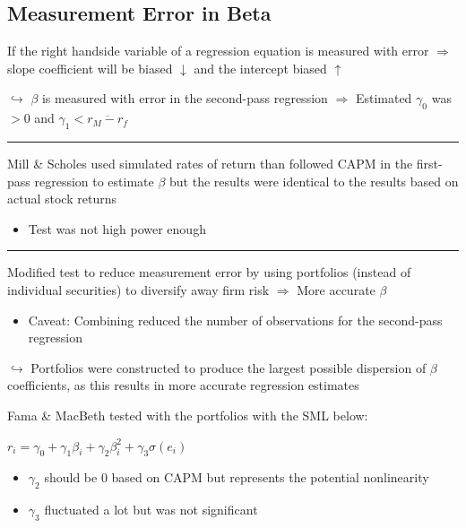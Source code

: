 \documentclass[]{book}
\providecommand{\tightlist}{%
  \setlength{\itemsep}{0pt}\setlength{\parskip}{0pt}}
\theoremstyle{definition}
\theoremstyle{definition}
\theoremstyle{remark}
\begin{document}
\subsection{Measurement Error in Beta}\label{measurement-error-in-beta}

If the right handside variable of a regression equation is measured with
error \(\Rightarrow\) slope coefficient will be biased \(\downarrow\)
and the intercept biased \(\uparrow\)

\(\hookrightarrow\) \(\beta\) is measured with error in the second-pass
regression \(\Rightarrow\) Estimated \(\gamma_0\) was \(> 0\) and
\(\gamma_1 < \overline{r_M - r_f}\)

\begin{center}\rule{0.5\linewidth}{\linethickness}\end{center}

Mill \& Scholes used simulated rates of return than followed CAPM in the
first-pass regression to estimate \(\beta\) but the results were
identical to the results based on actual stock returns

\begin{itemize}
\tightlist
\item
  Test was not high power enough
\end{itemize}

\begin{center}\rule{0.5\linewidth}{\linethickness}\end{center}

Modified test to reduce measurement error by using portfolios (instead
of individual securities) to diversify away firm risk \(\Rightarrow\)
More accurate \(\beta\)

\begin{itemize}
\tightlist
\item
  Caveat: Combining reduced the number of observations for the
  second-pass regression
\end{itemize}

\(\hookrightarrow\) Portfolios were constructed to produce the largest
possible dispersion of \(\beta\) coefficients, as this results in more
accurate regression estimates

Fama \& MacBeth tested with the portfolios with the SML below:

\(r_i = \gamma_0 + \gamma_1 \beta_i + \gamma_2 \beta_i^2 + \gamma_3 \sigma(e_i)\)

\begin{itemize}
\item
  \(\gamma_2\) should be 0 based on CAPM but represents the potential
  nonlinearity
\item
  \(\gamma_3\) fluctuated a lot but was not significant
\end{itemize}
\end{document}
